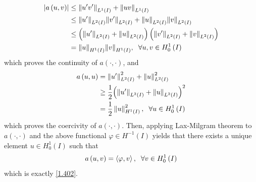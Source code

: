 \documentclass[a4paper,oneside]{article}
\numberwithin{equation}{section}
\begin{document}
\begin{align}
\left| {a\left( {u,v} \right)} \right| &\le {\left\| {u'v'} \right\|_{{L^1}\left( I \right)}} + {\left\| {uv} \right\|_{{L^1}\left( I \right)}}\\
 &\le {\left\| {u'} \right\|_{{L^2}\left( I \right)}}{\left\| {v'} \right\|_{{L^2}\left( I \right)}} + {\left\| u \right\|_{{L^2}\left( I \right)}}{\left\| v \right\|_{{L^2}\left( I \right)}}\\
& \le \left( {{{\left\| {u'} \right\|}_{{L^2}\left( I \right)}} + {{\left\| u \right\|}_{{L^2}\left( I \right)}}} \right)\left( {{{\left\| {v'} \right\|}_{{L^2}\left( I \right)}} + {{\left\| v \right\|}_{{L^2}\left( I \right)}}} \right)\\
& = {\left\| u \right\|_{{H^1}\left( I \right)}}{\left\| v \right\|_{{H^1}\left( I \right)}},\hspace{0.2cm}\forall u,v \in H_0^1\left( I \right)
\end{align}
which proves the continuity of $a\left( { \cdot , \cdot } \right)$, and
\begin{align}
a\left( {u,u} \right) &= \left\| {u'} \right\|_{{L^2}\left( I \right)}^2 + \left\| u \right\|_{{L^2}\left( I \right)}^2\\
& \ge \frac{1}{2}{\left( {{{\left\| {u'} \right\|}_{{L^2}\left( I \right)}} + {{\left\| u \right\|}_{{L^2}\left( I \right)}}} \right)^2}\\
& = \frac{1}{2}\left\| u \right\|_{{H^1}\left( I \right)}^2,\hspace{0.2cm}\forall u \in H_0^1\left( I \right)
\end{align}
which proves the coercivity of $a\left( { \cdot , \cdot } \right)$. Then, applying Lax-Milgram theorem to $a\left( { \cdot , \cdot } \right)$ and the above functional $\varphi \in H^{-1}\left(I\right)$ yields that there exists a unique element $u\in H_0^1\left(I\right)$ such that
\begin{align}
a\left( {u,v} \right) = \left\langle {\varphi ,v} \right\rangle ,\hspace{0.2cm}\forall v \in H_0^1\left( I \right)
\end{align}
which is exactly \eqref{1.402}. 
\end{document}
